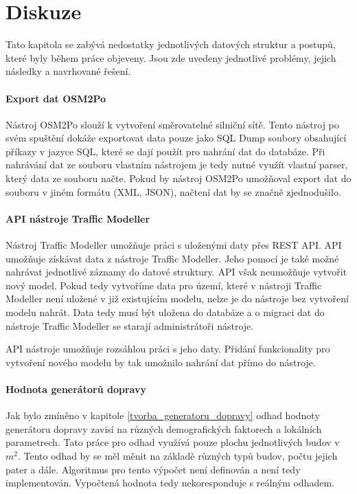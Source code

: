 \chapter{Diskuze}

Tato kapitola se zabývá nedostatky jednotlivých datových struktur a postupů, které byly během práce objeveny. Jsou zde uvedeny jednotlivé problémy, jejich následky a navrhované řešení. 

\subsubsection{Export dat OSM2Po}

Nástroj OSM2Po slouží k vytvoření směrovatelné silniční sítě. Tento nástroj po svém spuštění dokáže exportovat data pouze jako SQL Dump soubory obsahující příkazy v jazyce SQL, které se dají použít pro nahrání dat do databáze. Při nahrávání dat ze souboru vlastním nástrojem je tedy nutné využít vlastní parser, který data ze souboru načte. Pokud by nástroj OSM2Po umožňoval export dat do souboru v jiném formátu (XML, JSON), načtení dat by se značně zjednodušilo. 

\subsubsection{API nástroje Traffic Modeller}

Nástroj Traffic Modeller umožňuje práci s uloženými daty přes REST API. API umožňuje získávat data z nástroje Traffic Modeller. Jeho pomocí je také možné nahrávat jednotlivé záznamy do datové struktury. API však neumožňuje vytvořit nový model. Pokud tedy vytvoříme data pro území, které v nástroji Traffic Modeller není uložené v již existujícím modelu, nelze je do nástroje bez vytvoření modelu nahrát. Data tedy musí být uložena do databáze a o migraci dat do nástroje Traffic Modeller se starají administrátoři nástroje.

API nástroje umožňuje rozsáhlou práci s jeho daty. Přidání funkcionality pro vytvoření nového modelu by tak umožnilo nahrání dat přímo do nástroje.

\subsubsection{Hodnota generátorů dopravy}

Jak bylo zmíněno v kapitole \ref{tvorba_generatoru_dopravy} odhad hodnoty generátoru dopravy zavisí na různých demografických faktorech a lokálních parametrech. Tato práce pro odhad využívá pouze plochu jednotlivých budov v $m^2$. Tento odhad by se měl měnit na základě různých typů budov, počtu jejich pater a dále. Algoritmus pro tento výpočet není definován a není tedy implementován. Vypočtená hodnota tedy nekoresponduje s reálným odhadem.

